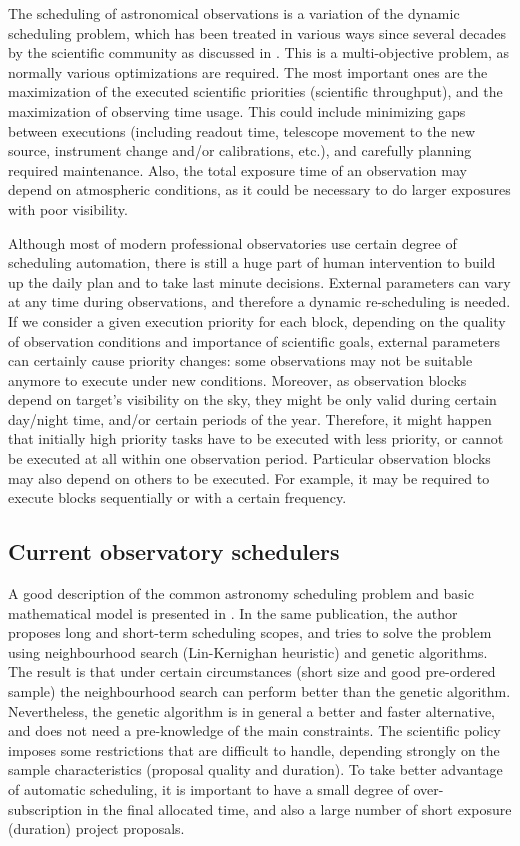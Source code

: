 \documentclass[11pt]{article}
\begin{document}
The scheduling of astronomical observations is a variation of the dynamic scheduling problem, which has been treated in various ways since several decades by the scientific community as discussed in \cite{gomez03}. This is a multi-objective problem, as normally various optimizations are required. The most important ones are the maximization of the executed scientific priorities (scientific throughput), and the maximization of observing time usage. This could include minimizing gaps between executions (including readout time, telescope movement to the new source, instrument change and/or calibrations, etc.), and carefully planning required maintenance. Also, the total exposure time of an observation may depend on atmospheric conditions, as it could be necessary to do larger exposures with poor visibility.

Although most of modern professional observatories use certain degree of scheduling automation, there is still a huge part of human intervention to build up the daily plan and to take last minute decisions. External parameters can vary at any time during observations, and therefore a dynamic re-scheduling is needed. If we consider a given execution priority for each block, depending on the quality of observation conditions and importance of scientific goals, external parameters can certainly cause priority changes: some observations may not be suitable anymore to execute under new conditions. Moreover, as observation blocks depend on target’s visibility on the sky, they might be only valid during certain day/night time, and/or certain periods of the year. Therefore, it might happen that initially high priority tasks have to be executed with less priority, or cannot be executed at all within one observation period. Particular observation blocks may also depend on others to be executed. For example, it may be required to execute blocks sequentially or with a certain frequency.

\subsection{Current observatory schedulers}

A good description of the common astronomy scheduling problem and basic mathematical model is presented in \cite{gomez03}. In the same publication, the author proposes long and short-term scheduling scopes, and tries to solve the problem using neighbourhood search (Lin-Kernighan heuristic) and genetic algorithms. The result is that under certain circumstances (short size and good pre-ordered sample) the neighbourhood search can perform better than the genetic algorithm. Nevertheless, the genetic algorithm is in general a better and faster alternative, and does not need a pre-knowledge of the main constraints. The scientific policy imposes some restrictions that are difficult to handle, depending strongly on the sample characteristics (proposal quality and duration). To take better advantage of automatic scheduling, it is important to have a small degree of over-subscription in the final allocated time, and also a large number of short exposure (duration) project proposals.
\end{document}

